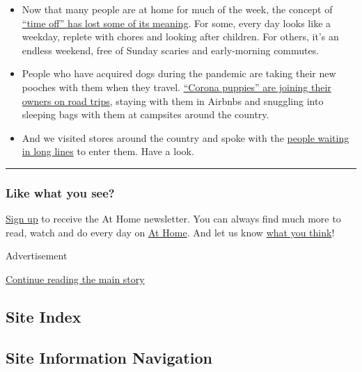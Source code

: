 \begin{itemize}
\item
  Now that many people are at home for much of the week, the concept of
  \href{https://www.nytimes3xbfgragh.onion/2020/09/09/style/what-should-i-do-this-weekend.html}{``time
  off'' has lost some of its meaning}. For some, every day looks like a
  weekday, replete with chores and looking after children. For others,
  it's an endless weekend, free of Sunday scaries and early-morning
  commutes.
\item
  People who have acquired dogs during the pandemic are taking their new
  pooches with them when they travel.
  \href{https://www.nytimes3xbfgragh.onion/2020/09/10/travel/virus-dogs-vacation.html}{``Corona
  puppies'' are joining their owners on road trips}, staying with them
  in Airbnbs and snuggling into sleeping bags with them at campsites
  around the country.
\item
  And we visited stores around the country and spoke with the
  \href{https://www.nytimes3xbfgragh.onion/2020/09/10/style/line-waiting-pandemic-shopping.html}{people
  waiting in long lines} to enter them. Have a look.
\end{itemize}

\begin{center}\rule{0.5\linewidth}{\linethickness}\end{center}

\hypertarget{like-what-you-see}{%
\subsubsection{Like what you see?}\label{like-what-you-see}}

\href{https://www.nytimes3xbfgragh.onion/newsletters/at-home}{Sign up}
to receive the At Home newsletter. You can always find much more to
read, watch and do every day on
\href{https://www.nytimes3xbfgragh.onion/spotlight/at-home}{At Home}.
And let us know
\href{https://nyt.qualtrics.com/jfe/form/SV_e9cKGVFtci4CObz}{what you
think}!

Advertisement

\protect\hyperlink{after-bottom}{Continue reading the main story}

\hypertarget{site-index}{%
\subsection{Site Index}\label{site-index}}

\hypertarget{site-information-navigation}{%
\subsection{Site Information
Navigation}\label{site-information-navigation}}

